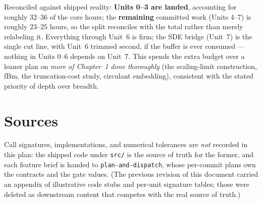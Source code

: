 \documentclass[11pt]{article}
\begin{document}
Reconciled against shipped reality: \textbf{Units 0--3 are landed}, accounting for roughly $32$--$36$
of the core hours; the \textbf{remaining} committed work (Units 4--7) is roughly $23$--$25$ hours, so
the split reconciles with the total rather than merely relabeling it. Everything through Unit~6 is
firm; the SDE bridge (Unit~7) is the single cut line, with Unit~6 trimmed second, if the buffer is ever
consumed --- nothing in Units 0--6 depends on Unit~7. This spends the extra budget over a leaner plan
on \emph{more of Chapter~1 done thoroughly} (the scaling-limit construction, fBm, the truncation-cost
study, circulant embedding), consistent with the stated priority of depth over breadth.

\section*{Sources}

Call signatures, implementations, and numerical tolerances are \emph{not} recorded in this plan: the
shipped code under \texttt{src/} is the source of truth for the former, and each feature brief is
handed to \texttt{plan-and-dispatch}, whose per-commit plans own the contracts and the gate values.
(The previous revision of this document carried an appendix of illustrative code stubs and per-unit
signature tables; those were deleted as downstream content that competes with the real source of
truth.)
\end{document}
